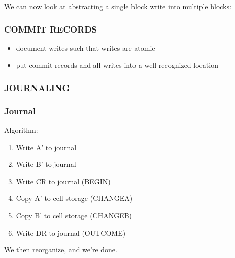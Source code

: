 \documentclass[../../lecture_notes.tex]{subfiles}
\begin{document}
We can now look at abstracting a single block write into multiple blocks:

\subsubsection{COMMIT RECORDS}
\begin{itemize}
	\item document writes such that writes are atomic
	\item put commit records and all writes into a well recognized location
\end{itemize}


\subsubsection{JOURNALING}
\begin{minipage}{0.5\linewidth}
{\centering\subsubsection*{Journal}}
\begin{center}
\end{center}
Algorithm:
\begin{enumerate}[nosep]
	\item Write A' to journal
	\item Write B' to journal
	\item Write CR to journal (BEGIN)
	\item Copy A' to cell storage (CHANGEA)
	\item Copy B' to cell storage (CHANGEB)
	\item Write DR to journal (OUTCOME)
\end{enumerate}
We then reorganize, and we're done.
\end{minipage}%
\end{document}

